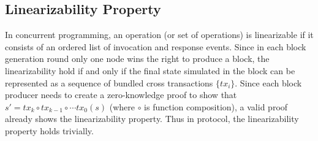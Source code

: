 



\subsection{Linearizability Property}
In concurrent programming, an operation (or set of operations) is linearizable if it consists of an ordered list of invocation and response events. Since in each block generation round only one node wins the right to produce a block, the linearizability hold if and only if the final state simulated in the block can be represented as a sequence of bundled cross transactions $\{tx_i\}$. Since each block producer needs to create a zero-knowledge proof to show that $s' = tx_k \circ tx_{k-1} \circ \cdots tx_0(s)$ (where $\circ$ is function composition), a valid proof already shows the linearizability property. Thus in \dprotocol protocol, the linearizability property holds trivially. 
